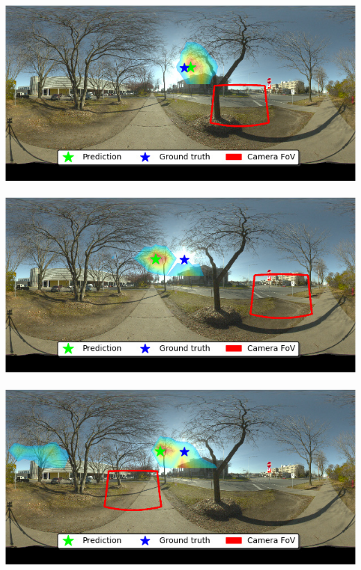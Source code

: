 \begin{minipage}{\linewidth}
\begin{multicols}{4}
\includegraphics[width=\mywidth]{AG8A2875_Panorama_hdr-corrected_002.jpg}\\
\vspace{\panoheight}\\
\includegraphics[width=\mywidth]{AG8A2875_Panorama_hdr-corrected_008.jpg}\\
\vspace{\panoheight}\\
\includegraphics[width=\mywidth]{AG8A2875_Panorama_hdr-corrected_007.jpg}\\
\vspace{\panoheight}\\

\end{multicols}
\end{minipage}
